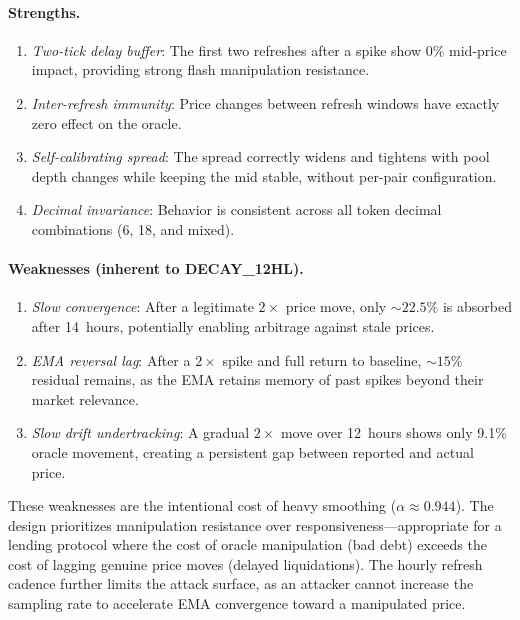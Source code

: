 \documentclass[10pt,a4paper,twocolumn]{article}
\begin{document}
\paragraph{Strengths.}
\begin{enumerate}[leftmargin=*]
\item \emph{Two-tick delay buffer}: The first two refreshes after a spike show 0\% mid-price impact, providing strong flash manipulation resistance.
\item \emph{Inter-refresh immunity}: Price changes between refresh windows have exactly zero effect on the oracle.
\item \emph{Self-calibrating spread}: The spread correctly widens and tightens with pool depth changes while keeping the mid stable, without per-pair configuration.
\item \emph{Decimal invariance}: Behavior is consistent across all token decimal combinations (6, 18, and mixed).
\end{enumerate}

\paragraph{Weaknesses (inherent to DECAY\_12HL).}
\begin{enumerate}[leftmargin=*]
\item \emph{Slow convergence}: After a legitimate $2\times$ price move, only ${\sim}22.5\%$ is absorbed after 14~hours, potentially enabling arbitrage against stale prices.
\item \emph{EMA reversal lag}: After a $2\times$ spike and full return to baseline, ${\sim}15\%$ residual remains, as the EMA retains memory of past spikes beyond their market relevance.
\item \emph{Slow drift undertracking}: A gradual $2\times$ move over 12~hours shows only 9.1\% oracle movement, creating a persistent gap between reported and actual price.
\end{enumerate}

These weaknesses are the intentional cost of heavy smoothing ($\alpha \approx 0.944$). The design prioritizes manipulation resistance over responsiveness---appropriate for a lending protocol where the cost of oracle manipulation (bad debt) exceeds the cost of lagging genuine price moves (delayed liquidations). The hourly refresh cadence further limits the attack surface, as an attacker cannot increase the sampling rate to accelerate EMA convergence toward a manipulated price.
\end{document}

